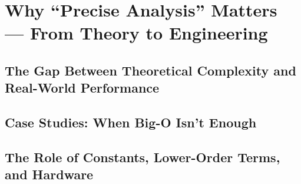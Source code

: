 \chapter{Why ``Precise Analysis'' Matters — From Theory to Engineering}
\section{The Gap Between Theoretical Complexity and Real-World Performance}
\section{Case Studies: When Big-O Isn't Enough}
\section{The Role of Constants, Lower-Order Terms, and Hardware}